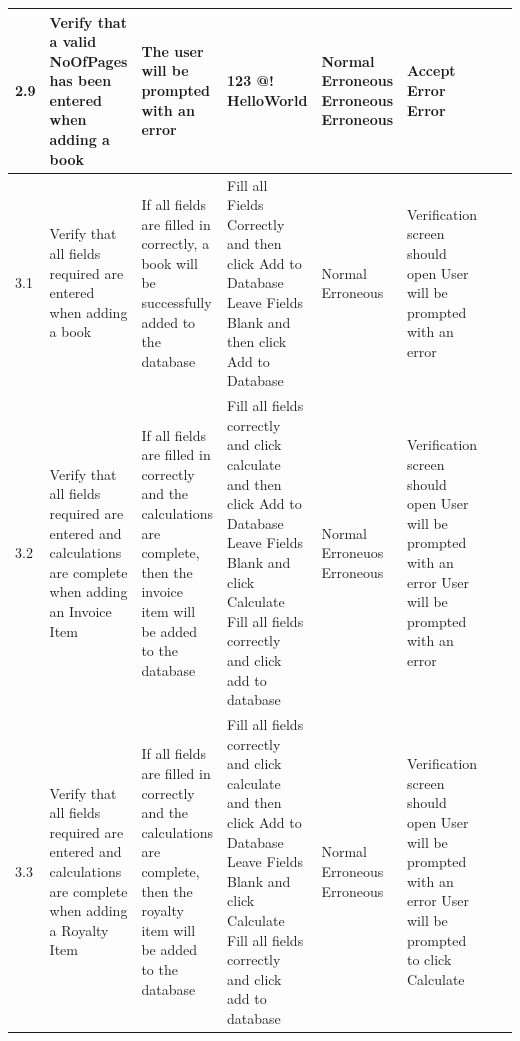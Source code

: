 \begin{landscape}
\begin{center}
\begin{longtable}{|p{1.5cm}|p{2cm}|p{2.5cm}|p{2.5cm}|p{2cm}|p{2cm}|p{2cm}|p{2cm}|}
        2.9 & Verify that a valid NoOfPages has been entered when adding a book & The user will be prompted with an error & 123 \newline 123456789 \newline 2.3 \newline @! \newline HelloWorld & Normal \newline Erroneous \newline Erroneous \newline Erroneous & Accept \newline Error \newline Error& & \\ \hline
        3.1 & Verify that all fields required are entered when adding a book & If all fields are filled in correctly, a book will be successfully added to the database & Fill all Fields Correctly and then click Add to Database \newline Leave Fields Blank and then click Add to Database & Normal \newline Erroneous & Verification screen should open \newline User will be prompted with an error & & \\ \hline
        3.2 & Verify that all fields required are entered and calculations are complete when adding an Invoice Item & If all fields are filled in correctly and the calculations are complete, then the invoice item will be added to the database & Fill all fields correctly and click calculate and then click Add to Database \newline Leave Fields Blank and click Calculate \newline Fill all fields correctly and click add to database & Normal \newline Erroneuos \newline Erroneous & Verification screen should open \newline User will be prompted with an error \newline User will be prompted with an error & & \\ \hline
        3.3 & Verify that all fields required are entered and calculations are complete when adding a Royalty Item & If all fields are filled in correctly and the calculations are complete, then the royalty item will be added to the database & Fill all fields correctly and click calculate and then click Add to Database \newline Leave Fields Blank and click Calculate \newline Fill all fields correctly and click add to database & Normal \newline Erroneous \newline Erroneous & Verification screen should open \newline User will be prompted with an error \newline User will be prompted to click Calculate & & \\ \hline

\end{longtable}
\end{center}
\end{landscape}
